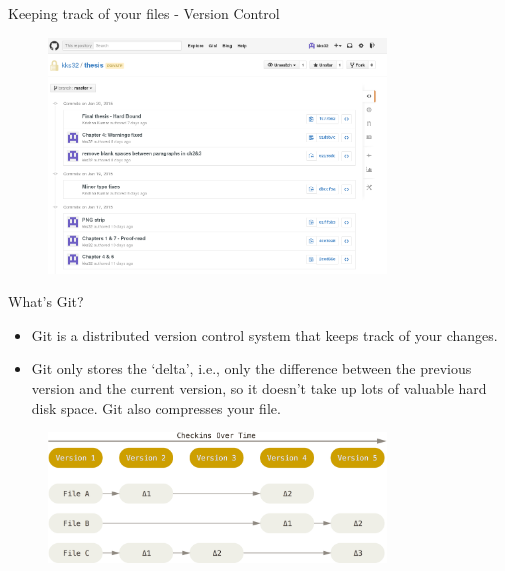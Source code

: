 \documentclass[10pt,times]{beamer}
\begin{document}
\begin{frame}{Keeping track of your files - Version Control}
\begin{figure}
  \centering
  \includegraphics[width=0.8\textwidth]{figs/thesis-git.png}
\end{figure}
\end{frame}

\begin{frame}{What's Git?}
\begin{itemize}
\item Git is a distributed version control system that keeps track of your 
changes.
\item Git only stores the `delta', i.e., only the difference between the 
previous version and the current version, so it doesn't take up lots of 
valuable hard disk space. Git also compresses your file.
\end{itemize}
\begin{figure}
  \centering
  \includegraphics[width=0.8\textwidth]{figs/git.png}
\end{figure}
\end{frame}
\end{document}
